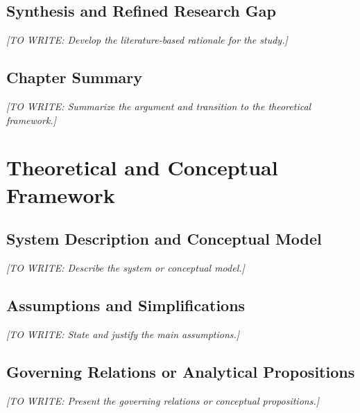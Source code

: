 \documentclass[12pt,a4paper,oneside]{report}
\newif\ifshowguidance
\newcommand{\Guide}[1]{%
  \ifshowguidance
  \begin{tcolorbox}[enhanced,breakable,colback=GuideBlue,
    colframe=GuideBorder,boxrule=0.5pt,arc=1mm,
    title={Writing guide --- replace with your research},
    colbacktitle=ThesisBlue,coltitle=white,fonttitle=\small\bfseries,
    before skip=10pt,after skip=10pt]
    \small #1
  \end{tcolorbox}
  \fi}
\newcommand{\Draft}[1]{\par\noindent\textit{[TO WRITE: #1]}\par}
\begin{document}
\section{Synthesis and Refined Research Gap}
\Guide{Connect the literature directly to your questions. State what is
established, what remains uncertain, and what evidence your study adds.
Identify why the proposed methodology is appropriate for this gap.}
\Draft{Develop the literature-based rationale for the study.}

\section{Chapter Summary}
\Draft{Summarize the argument and transition to the theoretical framework.}

\chapter{Theoretical and Conceptual Framework}
\label{ch:theory}
\Guide{Explain the concepts, mechanisms, governing relations, or analytical
lenses needed to understand your methods. Merge this chapter with the
literature review or methodology if a separate chapter would repeat material.}

\section{System Description and Conceptual Model}
\Guide{Identify the system boundary, components, inputs, outputs, mechanisms,
and interactions. For empirical research, define constructs and proposed
relationships. For computational work, define the physical or mathematical
domain. Use a conceptual diagram only when it clarifies the relationships.}
\Draft{Describe the system or conceptual model.}

\section{Assumptions and Simplifications}
\Guide{List assumptions explicitly and explain their rationale and expected
effects. Distinguish assumptions imposed by theory from choices made for
tractability. Identify assumptions later tested by sensitivity analysis.}
\Draft{State and justify the main assumptions.}

\section{Governing Relations or Analytical Propositions}
\Guide{Present the equations, propositions, theoretical arguments, or
conceptual relationships on which the method depends. Define every symbol
and unit at first use, cite borrowed formulations, and state applicable
conditions. Put lengthy routine derivations in an appendix.}
\Draft{Present the governing relations or conceptual propositions.}
\end{document}
